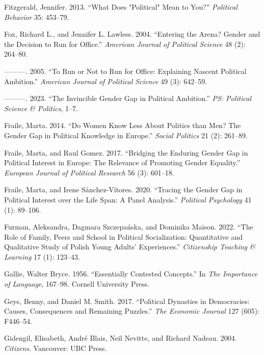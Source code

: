\documentclass[
  letterpaper,
  DIV=11,
  numbers=noendperiod]{scrreprt}
\newlength{\cslhangindent}
\newenvironment{CSLReferences}[2] %
 {\begin{list}{}{%
  \setlength{\itemindent}{0pt}
  \setlength{\leftmargin}{0pt}
  \setlength{\parsep}{0pt}
  \ifodd #1
   \setlength{\leftmargin}{\cslhangindent}
   \setlength{\itemindent}{-1\cslhangindent}
  \fi
  \setlength{\itemsep}{#2\baselineskip}}}
 {\end{list}}
\begin{document}
\begin{CSLReferences}{1}{0}
Fitzgerald, Jennifer. 2013. {``{What Does "Political" Mean to You?}''}
\emph{Political Behavior} 35: 453--79.

Fox, Richard L., and Jennifer L. Lawless. 2004. {``{Entering the Arena?
Gender and the Decision to Run for Office}.''} \emph{American Journal of
Political Science} 48 (2): 264--80.

---------. 2005. {``{To Run or Not to Run for Office: Explaining Nascent
Political Ambition}.''} \emph{American Journal of Political Science} 49
(3): 642--59.

---------. 2023. {``{The Invincible Gender Gap in Political
Ambition}.''} \emph{PS: Political Science \& Politics}, 1--7.

Fraile, Marta. 2014. {``{Do Women Know Less About Politics than Men? The
Gender Gap in Political Knowledge in Europe}.''} \emph{Social Politics}
21 (2): 261--89.

Fraile, Marta, and Raul Gomez. 2017. {``{Bridging the Enduring Gender
Gap in Political Interest in Europe: The Relevance of Promoting Gender
Equality}.''} \emph{European Journal of Political Research} 56 (3):
601--18.

Fraile, Marta, and Irene Sánchez-Vítores. 2020. {``{Tracing the Gender
Gap in Political Interest over the Life Span: A Panel Analysis}.''}
\emph{Political Psychology} 41 (1): 89--106.

Furman, Aleksandra, Dagmara Szczepańska, and Dominika Maison. 2022.
{``{The Role of Family, Peers and School in Political Socialization:
Quantitative and Qualitative Study of Polish Young Adults'
Experiences}.''} \emph{Citizenship Teaching \& Learning} 17 (1):
123--43.

Gallie, Walter Bryce. 1956. {``{Essentially Contested Concepts}.''} In
\emph{{The Importance of Language}}, 167--98. Cornell University Press.

Geys, Benny, and Daniel M. Smith. 2017. {``{Political Dynasties in
Democracies: Causes, Consequences and Remaining Puzzles}.''} \emph{The
Economic Journal} 127 (605): F446--54.

Gidengil, Elisabeth, André Blais, Neil Nevitte, and Richard Nadeau.
2004. \emph{Citizens}. Vancouver: UBC Press.


\end{CSLReferences}
\end{document}

